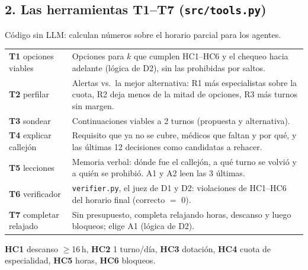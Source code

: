 \documentclass[9pt,a4paper]{extarticle}
\newcommand{\tabfont}{\fontsize{6.7}{7.7}\selectfont\setlength{\tabcolsep}{2.6pt}}
\newcommand{\notefont}{\fontsize{6.2}{7.1}\selectfont}
\begin{document}
\begin{multicols}{2}
\section{2. Las herramientas T1--T7 (\texttt{src/tools.py})}
Código sin LLM: calculan números sobre el horario parcial para los agentes.\par
{\tabfont
\begin{tabularx}{\linewidth}{@{}L{19mm}Y@{}}
\toprule
\textbf{T1} opciones viables & Opciones para $k$ que cumplen HC1--HC6 y el chequeo hacia adelante (lógica de D2), sin las prohibidas por saltos. \\
\addlinespace[1pt]
\textbf{T2} perfilar & Alertas vs.\ la mejor alternativa: R1 más especialistas sobre la cuota, R2 deja menos de la mitad de opciones, R3 más turnos sin margen. \\
\addlinespace[1pt]
\textbf{T3} sondear & Continuaciones viables a 2 turnos (propuesta y alternativa). \\
\addlinespace[1pt]
\textbf{T4} explicar callejón & Requisito que ya no se cubre, médicos que faltan y por qué, y las últimas 12 decisiones como candidatas a rehacer. \\
\addlinespace[1pt]
\textbf{T5} lecciones & Memoria verbal: dónde fue el callejón, a qué turno se volvió y a quién se prohibió. A1 y A2 leen las 3 últimas. \\
\addlinespace[1pt]
\textbf{T6} verificador & \texttt{verifier.py}, el juez de D1 y D2: violaciones de HC1--HC6 del horario final (correcto $=$ 0). \\
\addlinespace[1pt]
\textbf{T7} completar relajado & Sin presupuesto, completa relajando horas, descanso y luego bloqueos; elige A1 (lógica de D2). \\
\bottomrule
\end{tabularx}\par}
{\notefont \textbf{HC1} descanso $\geq$16\,h, \textbf{HC2} 1 turno/día, \textbf{HC3} dotación, \textbf{HC4} cuota de especialidad, \textbf{HC5} horas, \textbf{HC6} bloqueos.\par}


\end{multicols}
\end{document}
